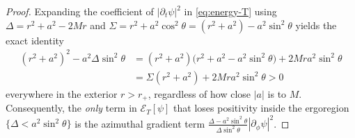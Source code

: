 \documentclass[11pt, a4paper]{article}
\theoremstyle{remark}
\begin{document}
\begin{proof}
Expanding the coefficient of $|\partial_t\psi|^2$ in \eqref{eq:energy-T} using $\Delta = r^2 + a^2 - 2Mr$ and $\Sigma = r^2 + a^2\cos^2\theta = (r^2 + a^2) - a^2\sin^2\theta$ yields the exact identity
\begin{align}
(r^2 + a^2)^2 - a^2\Delta\sin^2\theta &= (r^2 + a^2)\big(r^2 + a^2 - a^2\sin^2\theta\big) + 2Mra^2\sin^2\theta \nonumber \\
                                      &= \Sigma(r^2 + a^2) + 2Mra^2\sin^2\theta > 0
\end{align}
everywhere in the exterior $r > r_+$, regardless of how close $|a|$ is to $M$. Consequently, the \emph{only} term in $\mathcal{E}_T[\psi]$ that loses positivity inside the ergoregion $\{\Delta < a^2\sin^2\theta\}$ is the azimuthal gradient term $\frac{\Delta - a^2\sin^2\theta}{\Delta\sin^2\theta}|\partial_\phi\psi|^2$.


\end{proof}
\end{document}
